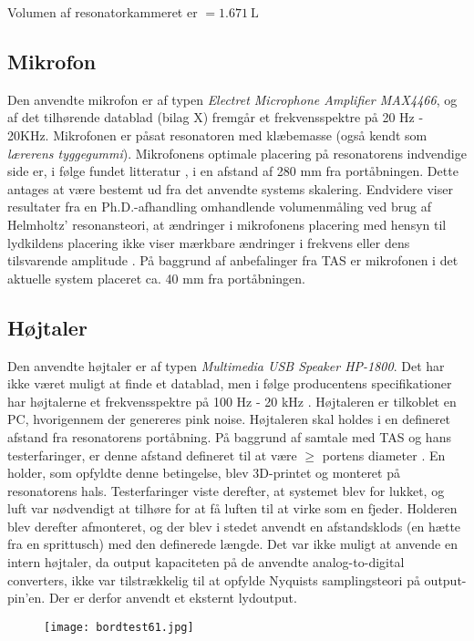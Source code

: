 Volumen af resonatorkammeret er $={\SI{1.671}{\liter}}$
 
\subsection{Mikrofon}
Den anvendte mikrofon er af typen \textit{Electret Microphone Amplifier MAX4466}, og af det tilhørende datablad (bilag X) fremgår et frekvensspektre på 20 Hz - 20KHz. Mikrofonen er påsat resonatoren med klæbemasse (også kendt som \textit{lærerens tyggegummi}).  
Mikrofonens optimale placering på resonatorens indvendige side er, i følge fundet litteratur \citep{RefWorks:11}, i en afstand af 280 mm fra portåbningen. Dette antages at være bestemt ud fra det anvendte systems skalering. Endvidere viser resultater fra en Ph.D.-afhandling omhandlende volumenmåling ved brug af Helmholtz' resonansteori, at ændringer i mikrofonens placering med hensyn til lydkildens placering ikke viser mærkbare ændringer i frekvens eller dens tilsvarende amplitude \citep{RefWorks:22}. På baggrund af anbefalinger fra TAS er mikrofonen i det aktuelle system placeret ca. 40 mm fra portåbningen.  

\subsection{Højtaler}
Den anvendte højtaler er af typen \textit{Multimedia USB Speaker HP-1800}. Det har ikke været muligt at finde et datablad, men i følge producentens specifikationer har højtalerne et frekvensspektre på 100 Hz - 20 kHz \citep{RefWorks:30}. Højtaleren er tilkoblet en PC, hvorigennem der genereres pink noise. Højtaleren skal holdes i en defineret afstand fra resonatorens portåbning.  På baggrund af samtale med TAS og hans testerfaringer, er denne afstand defineret til at være $\geq$ portens diameter \citep{RefWorks:31}. En holder, som opfyldte denne betingelse, blev 3D-printet og monteret på resonatorens hals. Testerfaringer viste derefter, at systemet blev for lukket, og luft var nødvendigt at tilhøre for at få luften til at virke som en fjeder. Holderen blev derefter afmonteret, og der blev i stedet anvendt en afstandsklods (en hætte fra en sprittusch) med den definerede længde. Det var ikke muligt at anvende en intern højtaler, da output kapaciteten på de anvendte analog-to-digital converters, ikke var tilstrækkelig til at opfylde Nyquists samplingsteori på output-pin'en. Der er derfor anvendt et eksternt lydoutput. 

\begin{figure}[!h]
\centering
\texttt{[image: bordtest61.jpg]}
\caption{}
\label{fig:resmedholder}	
\end{figure}

